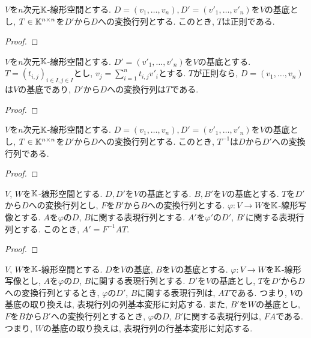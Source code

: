 \begin{prop}
  $V$を$n$次元$\mathbb{K}$-線形空間とする.
  $D=(v_1,\ldots, v_n),D'=(v'_1,\ldots, v'_n)$を$V$の基底とし,
  $T\in\mathbb{K}^{n\times n}$を$D'$から$D$への変換行列とする.
  このとき, $T$は正則である.
\end{prop}
\begin{proof}\end{proof}

\begin{prop}
  $V$を$n$次元$\mathbb{K}$-線形空間とする.
  $D'=(v'_1,\ldots, v'_n)$を$V$の基底とする.
  $T=(t_{i,j})_{i\in I, j\in I}$とし,
  $v_j=\sum_{i=1}^n t_{i,j}v'_i$とする.
  $T$が正則なら,
  $D=(v_1,\ldots, v_n)$は$V$の基底であり,
  $D'$から$D$への変換行列は$T$である.
\end{prop}
\begin{proof}\end{proof}


\begin{prop}
  $V$を$n$次元$\mathbb{K}$-線形空間とする.
  $D=(v_1,\ldots, v_n),D'=(v'_1,\ldots, v'_n)$を$V$の基底とし,
  $T\in\mathbb{K}^{n\times n}$を$D'$から$D$への変換行列とする.
  このとき, $T^{-1}$は$D$から$D'$への変換行列である.
\end{prop}
\begin{proof}\end{proof}



\begin{prop}
  $V$, $W$を$\mathbb{K}$-線形空間とする.
  $D, D'$を$V$の基底とする.
  $B, B'$を$V$の基底とする.
  $T$を$D'$から$D$への変換行列とし,
  $F$を$B'$から$B$への変換行列とする.
  $\varphi\colon V\to W$を$\mathbb{K}$-線形写像とする.
  $A$を$\varphi$の$D$, $B$に関する表現行列とする.
  $A'$を$\varphi'$の$D'$, $B'$に関する表現行列とする.
  このとき,
  $A'=F^{-1}AT$.
\end{prop}
\begin{proof}\end{proof}

\begin{remark}
  $V$, $W$を$\mathbb{K}$-線形空間とする.
  $D$を$V$の基底,
  $B$を$V$の基底とする.
  $\varphi\colon V\to W$を$\mathbb{K}$-線形写像とし,
  $A$を$\varphi$の$D$, $B$に関する表現行列とする.
  $D'$を$V$の基底とし,
  $T$を$D'$から$D$への変換行列とするとき,
  $\varphi$の$D'$, $B$に関する表現行列は,
  $AT$である.
  つまり, $V$の基底の取り換えは,
  表現行列の列基本変形に対応する.
  また,
  $B'$を$W$の基底とし,
  $F$を$B$から$B'$への変換行列とするとき,
  $\varphi$の$D$, $B'$に関する表現行列は,
  $FA$である.
  つまり, $W$の基底の取り換えは,
  表現行列の行基本変形に対応する.
\end{remark}


